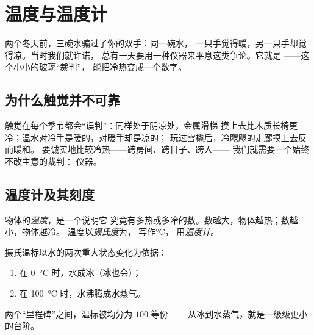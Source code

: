 \chapter{温度与温度计}\label{ch:g3:temperature-thermometers}

两个冬天前，三碗水骗过了你的双手：同一碗水，
一只手觉得暖，另一只手却觉得凉。当时我们就许诺，
总有一天要用一种仪器来平息这类争论。它就是
——这个小小的玻璃“裁判”，
能把冷热变成一个数字。

\section{为什么触觉并不可靠}

\begin{example}[不公正的“裁判”]\label{ex:g3:temperature-thermometers:unfair}
触觉在每个季节都会“误判”：同样处于阴凉处，金属滑梯
摸上去比木质长椅更冷；温水对冷手是暖的，对暖手却是凉的；
玩过雪橇后，冷飕飕的走廊摸上去反而暖和。
要诚实地比较冷热——跨房间、跨日子、跨人——
我们就需要一个始终不改主意的裁判：
仪器。
\end{example}

\section{温度计及其刻度}

\begin{definition}[温度]\label{def:g3:temperature-thermometers:temperature}
物体的\emph{温度}，是一个说明它
究竟有多热或多冷的数。数越大，物体越热；数越小，物体越冷。
温度以\emph{摄氏度}为，
写作\unit{\celsius}，
用\emph{温度计}。
\end{definition}

\begin{proposition}\label{prop:g3:temperature-thermometers:milestones}
摄氏温标以水的两次重大状态变化为依据：
\begin{enumerate}
  \item 在 \qty{0}{\celsius} 时，水成冰（冰也会）；
  \item 在 \qty{100}{\celsius} 时，水沸腾成水蒸气。
\end{enumerate}
两个“里程碑”之间，温标被均分为 $100$ 等份——
从冰到水蒸气，就是一级级更小的台阶。
\end{proposition}


